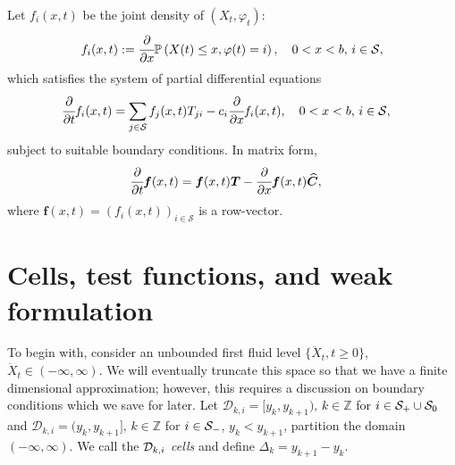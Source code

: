 Let $f_i(x,t)$ be the joint density of $(X_t, \varphi_t)$: 
	\begin{align*} 
	    f_i(x,t) := \cfrac{\partial}{\partial x} 	\mathbb{P}\left(X(t) \leq x, \varphi(t) = i\right),\quad 0<x<b,\, i \in\mathcal{S},
	\end{align*} 
which satisfies the system of partial differential equations 
%
\begin{align*}
\cfrac{\partial}{\partial t} f_i(x,t)& = \sum_{j\in \mathcal{S}}  f_j(x,t)T_{ji} - c_i \cfrac{\partial}{\partial x} f_i(x,t), \quad 0<x<b,\, i\in\mathcal S,
\end{align*}
% 
subject to suitable boundary conditions. In matrix form, 
\begin{align}
\cfrac{\partial}{\partial t} \boldsymbol f(x,t) &= \boldsymbol f(x,t)\boldsymbol T -  \cfrac{\partial}{\partial x}\boldsymbol f(x,t)\widehat{\boldsymbol C}\label{eqn:pde_density_matrix}, 
\end{align}
where \(\boldsymbol f(x,t) = \left(f_i(x,t)\right)_{i\in\mathcal S}\) is a row-vector. 

\section{Cells, test functions, and weak formulation}
To begin with, consider an unbounded first fluid level \(\{\ddot X_t,t\geq0\}\), \(\ddot X_t\in(-\infty,\infty)\). We will eventually truncate this space so that we have a finite dimensional approximation; however, this requires a discussion on boundary conditions which we save for later. Let \(\mathcal D_{k,i} = [y_k,y_{k+1}),\, k\in\mathbb Z\) for \(i\in\mathcal{S}_+\cup\mathcal{S}_0\) and \(\mathcal D_{k,i} = (y_k,y_{k+1}],\, k\in\mathbb Z\) for \(i\in\mathcal{S}_-\), \(y_k<y_{k+1}\), partition the domain \((-\infty,\infty)\). We call the \(\mathcal{D}_{k,i}\) \textit{cells} and define \(\Delta_k=y_{k+1}-y_k\). 

